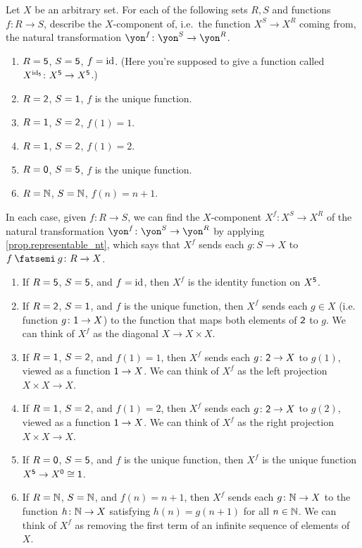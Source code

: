 \documentclass[Book-Poly]{subfiles}
\begin{document}
\begin{exercise} \label{exc.representable_nt_components}
Let $X$ be an arbitrary set. For each of the following sets $R,S$ and functions $f\colon R\to S$, describe the $X$-component of, i.e.\ the function $X^S\to X^R$ coming from, the natural transformation $\yon^f\colon\yon^S\to\yon^R$.
\begin{enumerate}
	\item \label{exc.representable_nt_components.id} $R=\textsf{5}$, $S=\textsf{5}$, $f=\mathrm{id}$.  (Here you're supposed to give a function called $X^{\mathrm{id}_{\textsf{5}}}\colon X^{\textsf{5}}\to X^{\textsf{5}}$.)
	\item $R=\textsf{2}$, $S=\textsf{1}$, $f$ is the unique function.
	\item $R=\textsf{1}$, $S=\textsf{2}$, $f(1)=1$.
	\item $R=\textsf{1}$, $S=\textsf{2}$, $f(1)=2$.
	\item $R=\textsf{0}$, $S=\textsf{5}$, $f$ is the unique function.
	\item $R=\mathbb{N}$, $S=\mathbb{N}$, $f(n)=n+1$.
\qedhere
\end{enumerate}

\begin{solution}
In each case, given $f \colon R \to S$, we can find the $X$-component $X^f \colon X^S \to X^R$ of the natural transformation $\yon^f\colon\yon^S\to\yon^R$ by applying \cref{prop.representable_nt}, which says that $X^f$ sends each $g \colon S \to X$ to $f \then g \colon R \to X$.
\begin{enumerate}
    \item If $R=\textsf{5}$, $S=\textsf{5}$, and $f=\mathrm{id}$, then $X^f$ is the identity function on $X^{\textsf{5}}$.
    \item If $R=\textsf{2}$, $S=\textsf{1}$, and $f$ is the unique function, then $X^f$ sends each $g \in X$ (i.e. function $g \colon \textsf{1} \to X$) to the function that maps both elements of $\textsf{2}$ to $g$.
    We can think of $X^f$ as the diagonal $X \to X \times X$.
	\item If $R=\textsf{1}$, $S=\textsf{2}$, and $f(1)=1$, then $X^f$ sends each $g \colon \textsf{2} \to X$ to $g(1)$, viewed as a function $\textsf{1} \to X$.
	We can think of $X^f$ as the left projection $X \times X \to X$.
	\item If $R=\textsf{1}$, $S=\textsf{2}$, and $f(1)=2$, then $X^f$ sends each $g \colon \textsf{2} \to X$ to $g(2)$, viewed as a function $\textsf{1} \to X$.
	We can think of $X^f$ as the right projection $X \times X \to X$.
	\item If $R=\textsf{0}$, $S=\textsf{5}$, and $f$ is the unique function, then $X^f$ is the unique function $X^{\textsf{5}} \to X^{\textsf{0}} \cong \textsf{1}$.
	\item If $R=\mathbb{N}$, $S=\mathbb{N}$, and $f(n)=n+1$, then $X^f$ sends each $g \colon \mathbb{N} \to X$ to the function $h \colon \mathbb{N} \to X$ satisfying $h(n) = g(n+1)$ for all $n \in \mathbb{N}$.
	We can think of $X^f$ as removing the first term of an infinite sequence of elements of $X$.
\end{enumerate}
\end{solution}
\end{exercise}
\end{document}
